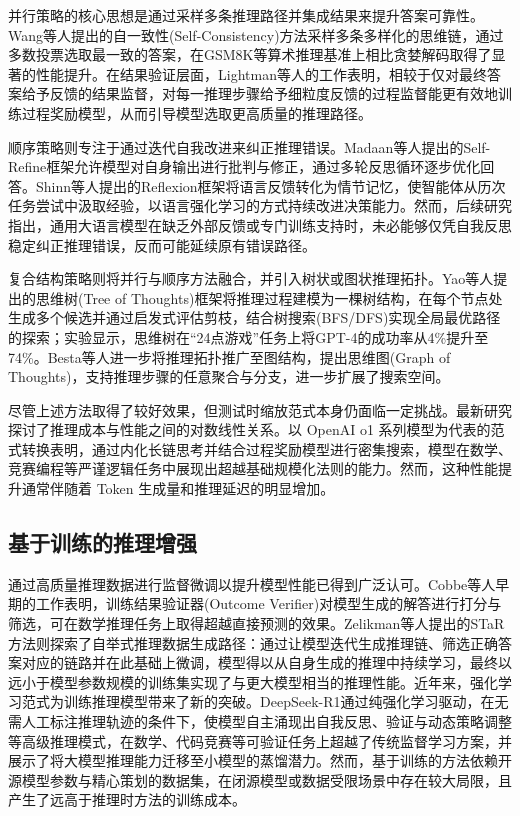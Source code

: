 \documentclass[promaster, vlined]{DissertUESTC}
\begin{document}
并行策略的核心思想是通过采样多条推理路径并集成结果来提升答案可靠性。Wang等人提出的自一致性(Self-Consistency)方法采样多条多样化的思维链，通过多数投票选取最一致的答案，在GSM8K等算术推理基准上相比贪婪解码取得了显著的性能提升\cite{wang2022}。在结果验证层面，Lightman等人的工作表明，相较于仅对最终答案给予反馈的结果监督，对每一推理步骤给予细粒度反馈的过程监督能更有效地训练过程奖励模型，从而引导模型选取更高质量的推理路径\cite{lightman2023}。

顺序策略则专注于通过迭代自我改进来纠正推理错误。Madaan等人提出的Self-Refine框架允许模型对自身输出进行批判与修正，通过多轮反思循环逐步优化回答\cite{madaan2023}。Shinn等人提出的Reflexion框架将语言反馈转化为情节记忆，使智能体从历次任务尝试中汲取经验，以语言强化学习的方式持续改进决策能力\cite{shinn2023}。然而，后续研究指出，通用大语言模型在缺乏外部反馈或专门训练支持时，未必能够仅凭自我反思稳定纠正推理错误，反而可能延续原有错误路径\cite{huang2023}。

复合结构策略则将并行与顺序方法融合，并引入树状或图状推理拓扑。Yao等人提出的思维树(Tree of Thoughts)框架将推理过程建模为一棵树结构，在每个节点处生成多个候选并通过启发式评估剪枝，结合树搜索(BFS/DFS)实现全局最优路径的探索\cite{yao2023}；实验显示，思维树在“24点游戏”任务上将GPT-4的成功率从4\%提升至74\%。Besta等人进一步将推理拓扑推广至图结构，提出思维图(Graph of Thoughts)，支持推理步骤的任意聚合与分支，进一步扩展了搜索空间\cite{besta2024}。

尽管上述方法取得了较好效果，但测试时缩放范式本身仍面临一定挑战。最新研究\cite{snell2024,setlur2025}探讨了推理成本与性能之间的对数线性关系。以 OpenAI o1 系列模型为代表的范式转换表明，通过内化长链思考并结合过程奖励模型进行密集搜索，模型在数学、竞赛编程等严谨逻辑任务中展现出超越基础规模化法则的能力。然而，这种性能提升通常伴随着 Token 生成量和推理延迟的明显增加\cite{wu2024comparative}。

\subsection{基于训练的推理增强}
通过高质量推理数据进行监督微调以提升模型性能已得到广泛认可\cite{cobbe2021,kumar2025llm}。Cobbe等人早期的工作表明，训练结果验证器(Outcome Verifier)对模型生成的解答进行打分与筛选，可在数学推理任务上取得超越直接预测的效果\cite{cobbe2021}。Zelikman等人提出的STaR方法则探索了自举式推理数据生成路径：通过让模型迭代生成推理链、筛选正确答案对应的链路并在此基础上微调，模型得以从自身生成的推理中持续学习，最终以远小于模型参数规模的训练集实现了与更大模型相当的推理性能\cite{zelikman2022}。近年来，强化学习范式为训练推理模型带来了新的突破。DeepSeek-R1通过纯强化学习驱动，在无需人工标注推理轨迹的条件下，使模型自主涌现出自我反思、验证与动态策略调整等高级推理模式，在数学、代码竞赛等可验证任务上超越了传统监督学习方案，并展示了将大模型推理能力迁移至小模型的蒸馏潜力\cite{deepseek2025}。然而，基于训练的方法依赖开源模型参数与精心策划的数据集，在闭源模型或数据受限场景中存在较大局限，且产生了远高于推理时方法的训练成本\cite{kumar2025llm}。
\end{document}
